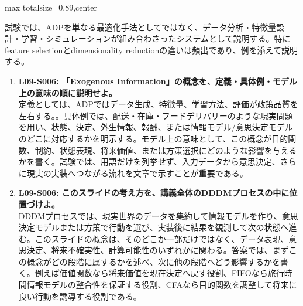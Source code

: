 \begin{minipage}[t]{0.58\textwidth}
\begin{adjustbox}{max totalsize={\textwidth}{0.89\textheight},center}
\begin{minipage}{\textwidth}
試験では、ADPを単なる最適化手法としてではなく、データ分析・特徴量設計・学習・シミュレーションが組み合わさったシステムとして説明する。特にfeature selectionとdimensionality reductionの違いは頻出であり、例を添えて説明する。\par{}\begin{enumerate}\item \textbf{L09-S006: 「Exogenous Information」の概念を、定義・具体例・モデル上の意味の順に説明せよ。}\\定義としては、ADPではデータ生成、特徴量、学習方法、評価が政策品質を左右する。。具体例では、配送・在庫・フードデリバリーのような現実問題を用い、状態、決定、外生情報、報酬、または情報モデル/意思決定モデルのどこに対応するかを明示する。モデル上の意味として、この概念が目的関数、制約、状態表現、将来価値、または方策選択にどのような影響を与えるかを書く。試験では、用語だけを列挙せず、入力データから意思決定、さらに現実の実装へつながる流れを文章で示すことが重要である。\item \textbf{L09-S006: このスライドの考え方を、講義全体のDDDMプロセスの中に位置づけよ。}\\DDDMプロセスでは、現実世界のデータを集約して情報モデルを作り、意思決定モデルまたは方策で行動を選び、実装後に結果を観測して次の状態へ進む。このスライドの概念は、そのどこか一部だけではなく、データ表現、意思決定、将来不確実性、計算可能性のいずれかに関わる。答案では、まずこの概念がどの段階に属するかを述べ、次に他の段階へどう影響するかを書く。例えば価値関数なら将来価値を現在決定へ戻す役割、FIFOなら旅行時間情報モデルの整合性を保証する役割、CFAなら目的関数を調整して将来に良い行動を誘導する役割である。\end{enumerate}
\end{minipage}
\end{adjustbox}
\end{minipage}


